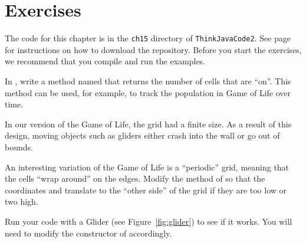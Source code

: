 \section{Exercises}

The code for this chapter is in the {\tt ch15} directory of {\tt ThinkJavaCode2}.
See page~\pageref{code} for instructions on how to download the repository.
Before you start the exercises, we recommend that you compile and run the examples.


\begin{exercise}
In , write a method named  that returns the number of cells that are ``on''.
This method can be used, for example, to track the population in Game of Life over time.
\end{exercise}


\begin{exercise}
In our version of the Game of Life, the grid had a finite size.
As a result of this design, moving objects such as gliders either crash into the wall or go out of bounds.

An interesting variation of the Game of Life is a ``periodic'' grid, meaning that the cells ``wrap around'' on the edges.
Modify the  method of  so that the coordinates  and  translate to the ``other side'' of the grid if they are too low or two high.

Run your code with a Glider (see Figure~\ref{fig:glider}) to see if it works.
You will need to modify the constructor of  accordingly.
\end{exercise}




